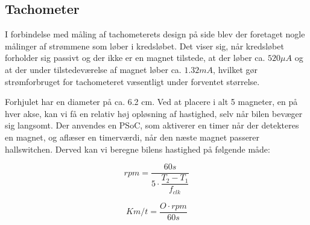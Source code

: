 \subsection{Tachometer}

I forbindelse med måling af tachometerets design på side \pageref{sub:systemarkitektur_tachometer} blev der foretaget nogle målinger af strømmene som løber i kredsløbet. Det viser sig, når kredsløbet forholder sig passivt og der ikke er en magnet tilstede, at der løber ca. $520\mu A$ og at der under tilstedeværelse af magnet løber ca. $1.32mA$, hvilket gør strømforbruget for tachometeret væsentligt under forventet størrelse.

Forhjulet har en diameter på ca. 6.2 cm. Ved at placere i alt 5 magneter, en på hver akse, kan vi få en relativ høj opløsning af hastighed, selv når bilen bevæger sig langsomt. Der anvendes en PSoC, som aktiverer en timer når der detekteres en magnet, og aflæser en timerværdi, når den næste magnet passerer hallswitchen. Derved kan vi beregne bilens hastighed på følgende måde:

\begin{equation}
rpm = \dfrac{60s}{5\cdot \dfrac{T_{2} - T_{1}}{f_{clk}}}
\end{equation}

\begin{equation}
Km/t = \dfrac{O\cdot rpm}{60s}
\end{equation}